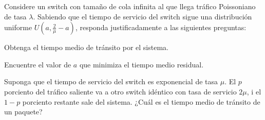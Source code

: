 \documentclass{upmassignment}
\date{\today}
\begin{document}
Considere un switch con tamaño de cola infinita
al que llega tráfico Poissoniano de tasa
$\lambda$. Sabiendo que el tiempo de
servicio del switch sigue una distribución
uniforme $U(a,\tfrac{2}{\mu}-a)$, responda
justificadamente a las siguientes preguntas:

\begin{problemlist}
    \pbitem Obtenga el tiempo medio
        de tránsito por el sistema.

    \begin{solucion}
        
    \end{solucion}


    \pbitem Encuentre el valor de $a$
        que minimiza el tiempo medio residual.
        \begin{solucion}
            
        \end{solucion}

    \pbitem Suponga que el tiempo de servicio
        del switch es exponencial de tasa
        $\mu$. El $p$ porciento del
        tráfico saliente va a otro switch
        idéntico con tasa de servicio $2\mu$,
        i el $1-p$ porciento restante sale
        del sistema.
        ¿Cuál es el tiempo medio de
        tránsito de un paquete?
        \begin{solucion}
            
        \end{solucion}

\end{problemlist}
\end{document}
